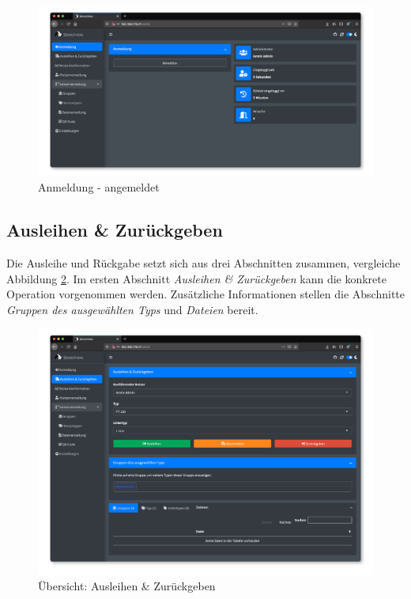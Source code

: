 \documentclass[
]{article}
\begin{document}
\begin{figure}
\centering
\includegraphics{./img/login_mask_logged.png}
\caption{\label{fig:login-mask-logged}Anmeldung - angemeldet}
\end{figure}

\hypertarget{operate}{%
\subsection{Ausleihen \& Zurückgeben}\label{operate}}

Die Ausleihe und Rückgabe setzt sich aus drei Abschnitten zusammen, vergleiche Abbildung \ref{fig:operate-overview}. Im ersten Abschnitt \emph{Ausleihen \& Zurückgeben} kann die konkrete Operation vorgenommen werden. Zusätzliche Informationen stellen die Abschnitte \emph{Gruppen des ausgewählten Typs} und \emph{Dateien} bereit.

\begin{figure}
\centering
\includegraphics{./img/operate_overview.png}
\caption{\label{fig:operate-overview}Übersicht: Ausleihen \& Zurückgeben}
\end{figure}
\end{document}
